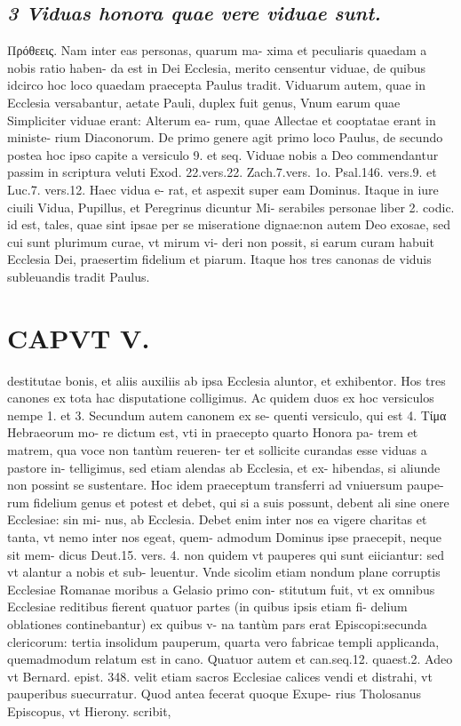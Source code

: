 \documentclass{article}
\begin{document}
\begin{pages}
\subsection*{\textit{3 Viduas honora quae vere viduae sunt. }}\pstart Πρόθεεις. Nam inter eas personas, quarum ma- xima et peculiaris quaedam a nobis ratio haben- da est in Dei Ecclesia, merito censentur viduae, de quibus idcirco hoc loco quaedam praecepta Paulus tradit. Viduarum autem, quae in Ecclesia versabantur, aetate Pauli, duplex fuit genus, Vnum earum quae Simpliciter viduae erant: Alterum ea- rum, quae Allectae et cooptatae erant in ministe- rium Diaconorum. De primo genere agit primo loco Paulus, de secundo postea hoc ipso capite a versiculo 9. et seq.  \pend\pstart Viduae nobis a Deo commendantur passim in scriptura veluti Exod. 22.vers.22. Zach.7.vers. 1o. Psal.146. vers.9. et Luc.7. vers.12. Haec vidua e- rat, et aspexit super eam Dominus. Itaque in iure ciuili Vidua, Pupillus, et Peregrinus dicuntur Mi- serabiles personae liber  2. codic. id est, tales, quae sint ipsae per se miseratione dignae:non autem Deo exosae, sed cui sunt plurimum curae, vt mirum vi- deri non possit, si earum curam habuit Ecclesia Dei, praesertim fidelium et piarum. Itaque hos tres canonas de viduis subleuandis tradit Paulus.  \pend
\section*{CAPVT  V. }
\marginpar{[ p.83 ]}\pstart destitutae bonis, et aliis auxiliis ab ipsa Ecclesia aluntor, et exhibentor.  \pend\pstart Hos tres canones ex tota hac disputatione colligimus. Ac quidem duos ex hoc versiculos nempe 1. et 3. Secundum autem canonem ex se- quenti versiculo, qui est 4. Tίμα Hebraeorum mo- re dictum est, vti in praecepto quarto Honora pa- trem et matrem, qua voce non tantùm reueren- ter et sollicite curandas esse viduas a pastore in- telligimus, sed etiam alendas ab Ecclesia, et ex- hibendas, si aliunde non possint se sustentare. Hoc idem praeceptum transferri ad vniuersum paupe- rum fidelium genus et potest et debet, qui si a suis possunt, debent ali sine onere Ecclesiae: sin mi- nus, ab Ecclesia. Debet enim inter nos ea vigere charitas et tanta, vt nemo inter nos egeat, quem- admodum Dominus ipse praecepit, neque sit mem- dicus Deut.15. vers. 4. non quidem vt pauperes qui sunt eiiciantur: sed vt alantur a nobis et sub- leuentur.  \pend\pstart Vnde sicolim etiam nondum plane corruptis Ecclesiae Romanae moribus a Gelasio primo con- stitutum fuit, vt ex omnibus Ecclesiae reditibus fierent quatuor partes (in quibus ipsis etiam fi- delium oblationes continebantur) ex quibus v- na tantùm pars erat Episcopi:secunda clericorum: tertia insolidum pauperum, quarta vero fabricae templi applicanda, quemadmodum relatum est in cano. Quatuor autem et can.seq.12. quaest.2. Adeo vt Bernard. epist. 348. velit etiam sacros Ecclesiae calices vendi et distrahi, vt pauperibus suecurratur. Quod antea fecerat quoque Exupe- rius Tholosanus Episcopus, vt Hierony. scribit,  \pend

\end{pages}
\end{document}
